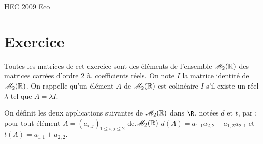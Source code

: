 \documentclass[11pt]{article}%
\begin{document}
\begin{center}
 HEC 2009 Eco 
\end{center}

\section*{Exercice}

Toutes les matrices de cet exercice sont des éléments de l'ensemble
$\mathscr{M}_{2}(\mathbb{R}) $ des matrices carrées d'ordre 2 
à. coefficients réels. On note $I$ la matrice identité de $\mathscr{M}_{2}(\mathbb{R}) $. On
rappelle qu'un élément 
$A$ de $\mathscr{M}_{2}(\mathbb{R}) $ est colinéaire $I$
s'il existe un réel $\lambda $ tel que $A = \lambda I$.

On définit les deux applications suivantes de $\mathscr{M}_{2}(\mathbb{R}) $ dans $\R$,
notées $d$ et $t$, par : pour
tout élément $A = \left( a_{i,j}\right)_{1\leq i,j\leq2}$ de.$\mathscr{M}_{2}(\mathbb{R}) $
$d(A) = a_{1,1}a_{2,2}-a_{1,2}a_{2,1} $ et $t(A) = a_{1,1} + a_{2,2}.$
\end{document}

